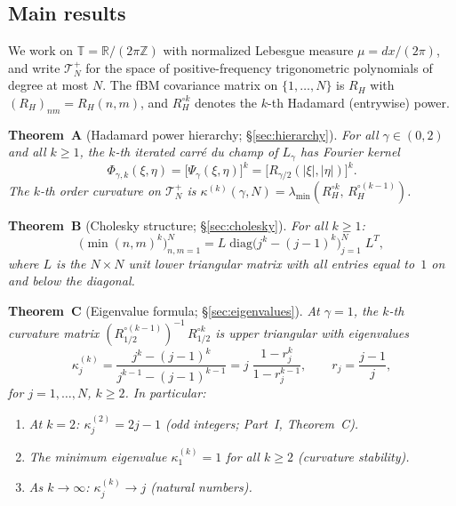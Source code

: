 \documentclass[11pt,a4paper]{article}
\theoremstyle{plain}
\theoremstyle{definition}
\theoremstyle{remark}
\newcommand{\R}{\mathbb{R}}
\newcommand{\Z}{\mathbb{Z}}
\newcommand{\T}{\mathbb{T}}
\begin{document}
\subsection{Main results}

We work on $\T = \R/(2\pi\Z)$ with normalized Lebesgue measure
$\mu = dx/(2\pi)$, and write $\mathcal{T}_N^+$ for the space
of positive-frequency trigonometric polynomials of degree at
most $N$. The fBM covariance matrix on $\{1,\ldots,N\}$ is
$R_H$ with $(R_H)_{nm} = R_H(n,m)$, and $R_H^{\circ k}$ denotes
the $k$-th Hadamard (entrywise) power.

\medskip\noindent
\textbf{Theorem~A} (Hadamard power hierarchy; \S\ref{sec:hierarchy}).
\emph{For all $\gamma \in (0,2)$ and all $k \geq 1$, the $k$-th
iterated carr\'e du champ of $L_\gamma$ has Fourier kernel
\begin{equation}\label{eq:intro-A}
  \Phi_{\gamma,k}(\xi,\eta)
  = \bigl[\Psi_\gamma(\xi,\eta)\bigr]^k
  = \bigl[R_{\gamma/2}(|\xi|,|\eta|)\bigr]^k.
\end{equation}
The $k$-th order curvature on $\mathcal{T}_N^+$ is
$\kappa^{(k)}(\gamma,N) =
 \lambda_{\min}(R_H^{\circ k},\, R_H^{\circ(k-1)})$.}

\medskip\noindent
\textbf{Theorem~B} (Cholesky structure; \S\ref{sec:cholesky}).
\emph{For all $k \geq 1$:
\begin{equation}\label{eq:intro-B}
  \bigl(\min(n,m)^k\bigr)_{n,m=1}^N
  = L\;\mathrm{diag}\bigl(j^k - (j{-}1)^k\bigr)_{j=1}^N\;L^T,
\end{equation}
where $L$ is the $N \times N$ unit lower triangular matrix
with all entries equal to~$1$ on and below the diagonal.}

\medskip\noindent
\textbf{Theorem~C} (Eigenvalue formula; \S\ref{sec:eigenvalues}).
\emph{At $\gamma = 1$, the $k$-th curvature matrix
$(R_{1/2}^{\circ(k-1)})^{-1}\,R_{1/2}^{\circ k}$
is upper triangular with eigenvalues
\begin{equation}\label{eq:intro-C}
  \kappa_j^{(k)}
  = \frac{j^k - (j-1)^k}{j^{k-1} - (j-1)^{k-1}}
  = j\;\frac{1 - r_j^k}{1 - r_j^{k-1}},
  \qquad r_j = \frac{j-1}{j},
\end{equation}
for $j = 1,\ldots,N$, $k \geq 2$. In particular:}
\begin{enumerate}[label=(\roman*)]
\item \emph{At $k = 2$:
  $\kappa_j^{(2)} = 2j - 1$ (odd integers; Part~I, Theorem~C).}
\item \emph{The minimum eigenvalue
  $\kappa_1^{(k)} = 1$ for all $k \geq 2$
  (curvature stability).}
\item \emph{As $k \to \infty$:
  $\kappa_j^{(k)} \to j$ (natural numbers).}
\end{enumerate}
\end{document}
